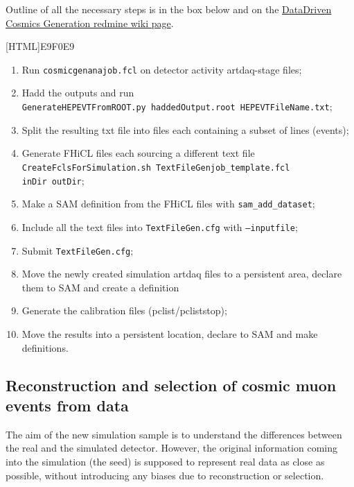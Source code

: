 \documentclass[12pt]{article}
\begin{document}
Outline of all the necessary steps is in the box below and on the \href{https://cdcvs.fnal.gov/redmine/projects/novaart/wiki/DataDriven\_Cosmics}{DataDriven Cosmics Generation redmine wiki page}.

\vspace{5mm}
[HTML]{E9F0E9}{
\parbox{.9\textwidth}{
\begin{enumerate}
\item Run \texttt{cosmicgenanajob.fcl} on detector activity artdaq-stage files;
\item Hadd the outputs and run\\\texttt{GenerateHEPEVTFromROOT.py haddedOutput.root HEPEVTFileName.txt};
\item Split the resulting txt file into files each containing a subset of lines (events);
\item Generate FHiCL files each sourcing a different text file \\\texttt{CreateFclsForSimulation.sh TextFileGenjob\_template.fcl}\\ \hspace*{58mm}\texttt{inDir outDir};
\item Make a SAM definition from the FHiCL files with \texttt{sam\_add\_dataset};
\item Include all the text files into \texttt{TextFileGen.cfg} with \texttt{--inputfile};
\item Submit \texttt{TextFileGen.cfg};
\item Move the newly created simulation artdaq files to a persistent area, declare them to SAM and create a definition 
\item Generate the calibration files (pclist/pcliststop);
\item Move the results into a persistent location, declare to SAM and make definitions.
\end{enumerate}
}}

\subsection{Reconstruction and selection of cosmic muon events from data}\label{secCosmicGenAna}

The aim of the new simulation sample is to understand the differences between the real and the simulated detector. However, the original information coming into the simulation (the seed) is supposed to represent real data as close as possible, without introducing any biases due to reconstruction or selection. 
\end{document}
